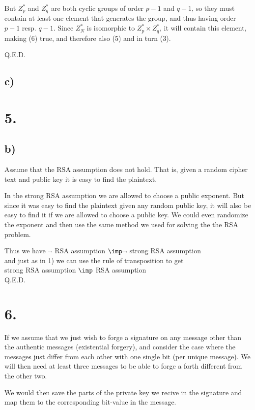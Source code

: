 \documentclass[a4paper,11pt]{article}
\begin{document}
	But $Z^*_p$ and $Z^*_q$ are both cyclic groups of order $p-1$ and $q-1$,
	so they must contain at least one element that generates the group, 
	and thus having order $p-1$ resp. $q-1$. Since $Z^*_N$ is isomorphic to $Z^*_p \times Z^*_q$,
	it will contain this element, making (6) true, and therefore also (5) and in turn (3).

	Q.E.D.

	\subsection*{c) }

	\section*{5. }

	\subsection*{b) }
	Assume that the RSA assumption does not hold. That is, given a random cipher text and
	public key it is easy to find the plaintext.
	
	In the strong RSA assumption we are allowed to choose a public exponent. But since it was
	easy to find the plaintext given any random public key, it will also be easy to find
	it if we are allowed to choose a public key. We could even randomize the exponent
	and then use the same method we used for solving the the RSA problem.

	Thus we have $\neg $ RSA assumption $ \imp \neg $ strong RSA assumption\\
	and just as in 1) we can use the rule of transposition to get\\
	strong RSA assumption $ \imp $ RSA assumption\\

	Q.E.D.

	\section*{6. }
	If we assume that we just wish to forge a signature on any message other than the authentic
	messages (existential forgery), and consider the case where the messages just differ from 
	each other with one single bit (per unique message). We will then need at least three 
	messages to be able to forge a forth different from the other two.

	We would then save the parts of the private key we recive in the signature and map
	them to the corresponding bit-value in the message.

		 
		
\end{document}
